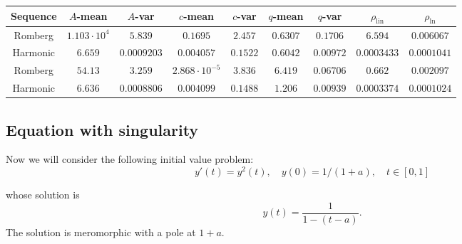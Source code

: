 \begin{table}[H]
    \centering
    \small
    \begin{tabular}{c||c|c|c|c|c|c|c|c}
Sequence & \(A\)-mean & \(A\)-var & \(c\)-mean & \(c\)-var & \(q\)-mean & \(q\)-var & \(\rho_{\operatorname{lin}}\) & \(\rho_{\ln}\)\\\hline
\rowcolor{red}
Romberg & \(1.103\cdot 10^4\) & \(5.839\) & \(0.1695\) & \(2.457\) & \(0.6307\) & \(0.1706\) & \(6.594\) & \(0.006067\) \\
\rowcolor{red}
Harmonic & \(6.659\) & \(0.0009203\) & \(0.004057\) & \(0.1522\) & \(0.6042\) & \(0.00972\) & \(0.0003433\) & \(0.0001041\) \\
\rowcolor{red}
Romberg & \(54.13\) & \(3.259\) & \(2.868\cdot 10^{-5}\) & \(3.836\) & \(6.419\) & \(0.06706\) & \(0.662\) & \(0.002097\) \\
\rowcolor{red}
Harmonic & \(6.636\) & \(0.0008806\) & \(0.004099\) & \(0.1488\) & \(1.206\) & \(0.00939\) & \(0.0003374\) & \(0.0001024\) \\
    \end{tabular}
    \label{tab:my_label}
\end{table}

\subsection{Equation with singularity}

Now we will consider the following initial value problem:
\begin{equation}\label{46}
y'(t) = y^2(t),\quad y(0) = 1/(1+a), \quad t\in [0,1]
\end{equation}

whose solution is 
\[
y(t) = \frac{1}{1-(t-a)}.
\]
The solution is meromorphic with a pole at \(1+a\).

